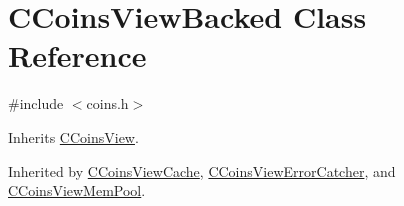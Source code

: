 \hypertarget{class_c_coins_view_backed}{}\section{C\+Coins\+View\+Backed Class Reference}
\label{class_c_coins_view_backed}


{\ttfamily \#include $<$coins.\+h$>$}



Inherits \mbox{\hyperlink{class_c_coins_view}{C\+Coins\+View}}.



Inherited by \mbox{\hyperlink{class_c_coins_view_cache}{C\+Coins\+View\+Cache}}, \mbox{\hyperlink{class_c_coins_view_error_catcher}{C\+Coins\+View\+Error\+Catcher}}, and \mbox{\hyperlink{class_c_coins_view_mem_pool}{C\+Coins\+View\+Mem\+Pool}}.

